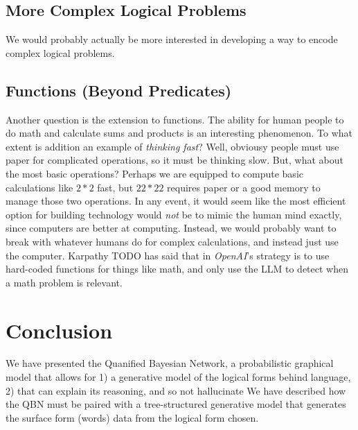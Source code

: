 \documentclass[12pt]{article}
\begin{document}
\subsection{More Complex Logical Problems}
We would probably actually be more interested in developing a way to encode complex logical problems.

\subsection{Functions (Beyond Predicates)}
Another question is the extension to functions.
The ability for human people to do math and calculate sums and products is an interesting phenomenon.
To what extent is addition an example of {\em thinking fast}?
Well, obviousy people must use paper for complicated operations, so it must be thinking slow.
But, what about the most basic operations?
Perhaps we are equipped to compute basic calculations like $2 * 2$ fast, but $22 * 22$ requires paper or a good memory to manage those two operations.
In any event, it would seem like the most efficient option for building technology would {\em not} be to mimic the human mind exactly, since computers are better at computing.
Instead, we would probably want to break with whatever humans do for complex calculations, and instead just use the computer.
Karpathy TODO has said that in {\em OpenAI}'s strategy is to use hard-coded functions for things like math, and only use the LLM to detect when a math problem is relevant.

\section{Conclusion}
We have presented the Quanified Bayesian Network, a probabilistic graphical model that allows for 1) a generative model of the logical forms behind language, 2) that can explain its reasoning, and so not hallucinate
We have described how the QBN must be paired with a tree-structured generative model that generates the surface form (words) data from the logical form chosen.



\end{document}
